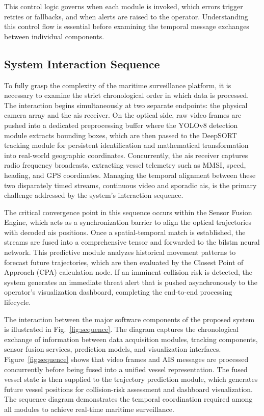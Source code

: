 This control logic governs when each module is invoked, which errors trigger retries or fallbacks, and when alerts are raised to the operator. Understanding this control flow is essential before examining the temporal message exchanges between individual components.

\subsection{System Interaction Sequence}

To fully grasp the complexity of the maritime surveillance platform, it is necessary to examine the strict chronological order in which data is processed. The interaction begins simultaneously at two separate endpoints: the physical camera array and the \gls{ais} receiver. On the optical side, raw video frames are pushed into a dedicated preprocessing buffer where the YOLOv8 detection module extracts bounding boxes, which are then passed to the DeepSORT tracking module for persistent identification and mathematical transformation into real-world geographic coordinates. Concurrently, the \gls{ais} receiver captures radio frequency broadcasts, extracting vessel telemetry such as MMSI, speed, heading, and GPS coordinates. Managing the temporal alignment between these two disparately timed streams, continuous video and sporadic \gls{ais}, is the primary challenge addressed by the system's interaction sequence.

The critical convergence point in this sequence occurs within the Sensor Fusion Engine, which acts as a synchronization barrier to align the optical trajectories with decoded \gls{ais} positions. Once a spatial-temporal match is established, the streams are fused into a comprehensive tensor and forwarded to the \gls{bilstm} neural network. This predictive module analyzes historical movement patterns to forecast future trajectories, which are then evaluated by the Closest Point of Approach (CPA) calculation node. If an imminent collision risk is detected, the system generates an immediate threat alert that is pushed asynchronously to the operator's visualization dashboard, completing the end-to-end processing lifecycle.
\begin{reportfigblock}
The interaction between the major software components of the proposed system is illustrated in Fig.~\ref{fig:sequence}. The diagram captures the chronological exchange of information between data acquisition modules, tracking components, sensor fusion services, prediction models, and visualization interfaces.
Figure~\ref{fig:sequence} shows that video frames and AIS messages are processed concurrently before being fused into a unified vessel representation. The fused vessel state is then supplied to the trajectory prediction module, which generates future vessel positions for collision-risk assessment and dashboard visualization. The sequence diagram demonstrates the temporal coordination required among all modules to achieve real-time maritime surveillance.
\end{reportfigblock}

